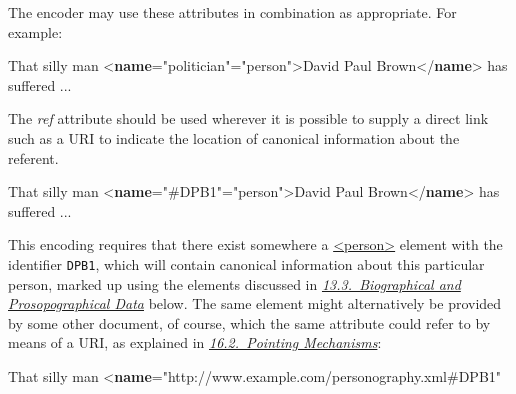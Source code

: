  The encoder may use these attributes in combination as appropriate. For example: \par\bgroup{}\exampleFont \begin{shaded}\noindent\mbox{}That silly man {<\textbf{name}\hspace*{1em}{role}="{politician}"\hspace*{1em}{type}="{person}">}David Paul Brown{</\textbf{name}>}\mbox{}\newline 
 has suffered ...\end{shaded}\egroup\par \noindent  The {\itshape ref} attribute should be used wherever it is possible to supply a direct link such as a URI to indicate the location of canonical information about the referent. \par\bgroup{}\exampleFont \begin{shaded}\noindent\mbox{}That silly man {<\textbf{name}\hspace*{1em}{ref}="{\#DPB1}"\hspace*{1em}{type}="{person}">}David Paul Brown{</\textbf{name}>} has\mbox{}\newline 
 suffered ...\end{shaded}\egroup\par \noindent  This encoding requires that there exist somewhere a \hyperref[TEI.person]{<person>} element with the identifier \texttt{DPB1}, which will contain canonical information about this particular person, marked up using the elements discussed in \textit{\hyperref[NDPERS]{13.3.\ Biographical and Prosopographical Data}} below. The same element might alternatively be provided by some other document, of course, which the same attribute could refer to by means of a URI, as explained in \textit{\hyperref[SAXP]{16.2.\ Pointing Mechanisms}}: \par\bgroup{}\exampleFont \begin{shaded}\noindent\mbox{}That silly man {<\textbf{name}\hspace*{1em}{ref}="{http://www.example.com/personography.xml\#DPB1}"\mbox{}\newline 
}
\end{shaded}
